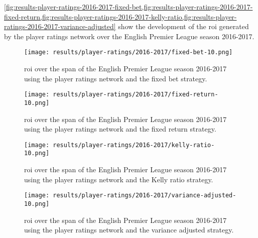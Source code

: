 \cref{fig:results-player-ratings-2016-2017-fixed-bet,fig:results-player-ratings-2016-2017-fixed-return,fig:results-player-ratings-2016-2017-kelly-ratio,fig:results-player-ratings-2016-2017-variance-adjusted} show the development of the \gls{roi} generated by the player ratings network over the English Premier League season 2016-2017.
\begin{figure}
    \centering
    \texttt{[image: results/player-ratings/2016-2017/fixed-bet-10.png]}
    \caption{\gls{roi} over the span of the English Premier League season 2016-2017 using the player ratings network and the fixed bet strategy.}
    \label{fig:results-player-ratings-2016-2017-fixed-bet}
\end{figure}
\begin{figure}
    \centering
    \texttt{[image: results/player-ratings/2016-2017/fixed-return-10.png]}
    \caption{\gls{roi} over the span of the English Premier League season 2016-2017 using the player ratings network and the fixed return strategy.}
    \label{fig:results-player-ratings-2016-2017-fixed-return}
\end{figure}
\begin{figure}
    \centering
    \texttt{[image: results/player-ratings/2016-2017/kelly-ratio-10.png]}
    \caption{\gls{roi} over the span of the English Premier League season 2016-2017 using the player ratings network and the Kelly ratio strategy.}
    \label{fig:results-player-ratings-2016-2017-kelly-ratio}
\end{figure}
\begin{figure}
    \centering
    \texttt{[image: results/player-ratings/2016-2017/variance-adjusted-10.png]}
    \caption{\gls{roi} over the span of the English Premier League season 2016-2017 using the player ratings network and the variance adjusted strategy.}
    \label{fig:results-player-ratings-2016-2017-variance-adjusted}
\end{figure}

